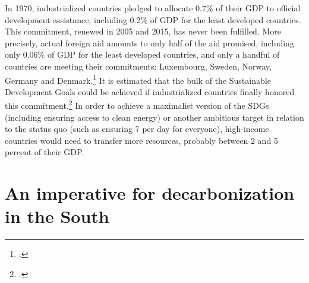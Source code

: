 \documentclass[a5paper,english,openany]{memoir}
\begin{document}
In 1970, industrialized %
countries pledged to allocate 0.7\% of their GDP to official development assistance, including 0.2\% of GDP for the least developed countries. This commitment, renewed in 2005 and 2015, has never been fulfilled. More precisely, actual foreign aid amounts to only half of the aid promised, including only 0.06\% of GDP for the least developed countries, and only a handful of countries are meeting their commitments: Luxembourg, Sweden, Norway, Germany and Denmark.\footnote{ %
\citep{oecd_oda_2023}.} 
It is estimated that the bulk of the Sustainable Development Goals %
could be achieved if industrialized %
countries finally honored %
this commitment.\footnote{\citet{sdsn_sdg_2019}.} In order to achieve %
a maximalist version of the SDGs (including ensuring access to clean energy) or another ambitious target in relation to the status quo (such as ensuring \textit{\texteuro{}}7 per day for everyone), high-income countries would need to transfer more resources, probably between 2 and 5 percent of their GDP.%


\section*{An imperative for decarbonization in the South}
\end{document}
